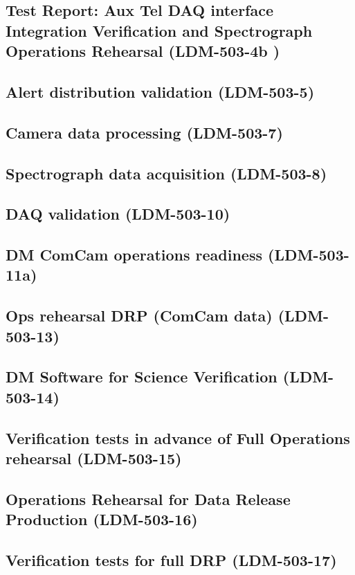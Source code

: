 \subsection{Test Report: Aux Tel DAQ interface Integration Verification and Spectrograph Operations Rehearsal \textbf{(LDM-503-4b )}\label{LDM-503-4b }}

\subsection{Alert distribution validation \textbf{(LDM-503-5)}\label{LDM-503-5}}

\subsection{Camera data processing \textbf{(LDM-503-7)}\label{LDM-503-7}}

\subsection{Spectrograph data acquisition \textbf{(LDM-503-8)}\label{LDM-503-8}}

\subsection{DAQ validation \textbf{(LDM-503-10)}\label{LDM-503-10}}

\subsection{DM ComCam operations readiness \textbf{(LDM-503-11a)}\label{LDM-503-11a}}

\subsection{Ops rehearsal DRP (ComCam data) \textbf{(LDM-503-13)}\label{LDM-503-13}}
\subsection{DM Software for Science Verification \textbf{(LDM-503-14)}\label{LDM-503-14}}
\subsection{Verification tests in advance of Full Operations rehearsal  \textbf{(LDM-503-15)}\label{LDM-503-15}}

\subsection{Operations Rehearsal for Data Release Production  \textbf{(LDM-503-16)}\label{LDM-503-16}}

\subsection{Verification tests for full DRP \textbf{(LDM-503-17)}\label{LDM-503-17}}

